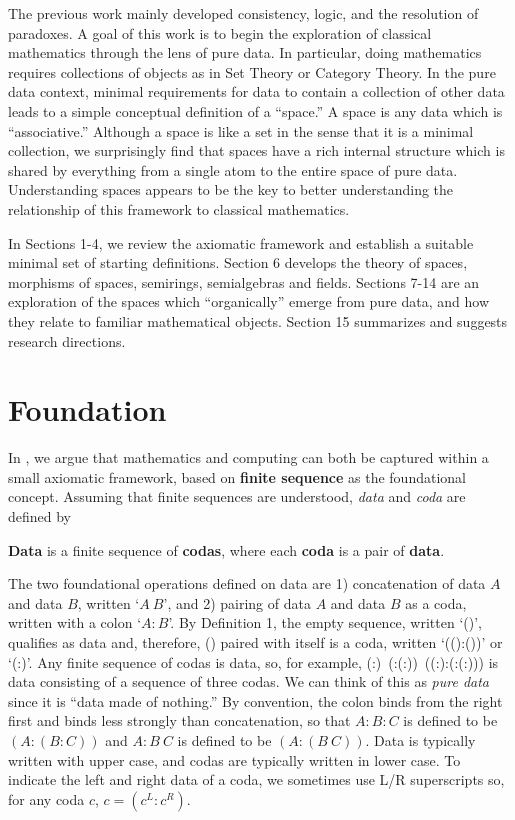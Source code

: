 \documentclass[11pt]{article}
\begin{document}
       The previous work mainly developed  
consistency, logic, and the resolution of paradoxes\cite{PDF}.  A goal of this work is to begin the exploration of classical 
mathematics through the lens of pure data.  In particular, doing mathematics requires 
collections of objects as in Set Theory or Category Theory.  In the pure data context, minimal requirements for 
data to contain a collection of other data leads to a simple conceptual definition of a ``space.''  A space is any data 
which is ``associative.''  Although a space is like a set in the sense that it is a minimal collection, we surprisingly 
find that spaces have a rich internal structure which is shared by everything from a single atom to the entire 
space of pure data.  Understanding spaces appears to be the key 
to better understanding the relationship of this framework to classical mathematics.  

     In Sections 1-4, we review the axiomatic framework and establish a suitable minimal set of starting definitions.  
 Section 6 develops the theory of spaces, morphisms of spaces, semirings, semialgebras and fields.   Sections 7-14 
 are an exploration of the spaces which ``organically'' emerge from pure data, and how they relate to familiar mathematical objects.  
 Section 15 summarizes and suggests research directions. 

\section{Foundation}  

In \cite{PDF}, we argue that mathematics and computing can both be captured within a small axiomatic framework, 
based on {\bf finite sequence} as the foundational concept.  Assuming that finite sequences are understood, {\it data} and {\it coda} are defined by 

\begin{definition} {{\bf Data} is a finite sequence of {\bf codas}, where each {\bf coda} is a pair of {\bf data}.}
\end{definition}

\noindent The two foundational operations defined on data are 1) concatenation of data $A$ and data $B$, written `$A\ B$', and 2) pairing of data $A$ and data $B$ as a coda, written with a colon `$A:B$'.   
By Definition 1, the empty sequence, written `()', qualifies as data and, therefore, () paired with itself is a coda, written `(():())' or `(:)'.  
Any finite sequence of codas is data, so, for example, (:)\ (:(:))\ ((:):(:(:))) is  
data consisting of a sequence of three codas.  We can think of this as {\it pure data} since it is ``data made of nothing.''  
By convention, the colon binds from the right first and binds less strongly than concatenation, so that $A:B:C$ is defined to be $(A:(B:C))$ and $A:B\ C$ is defined to be $(A:(B\ C))$.  
Data is typically written with upper case, and codas are typically written in lower case.  
To indicate the left and right data of a coda, we sometimes use L/R superscripts so, for any coda $c$, $c=(c^L:c^R)$. 
\end{document}
